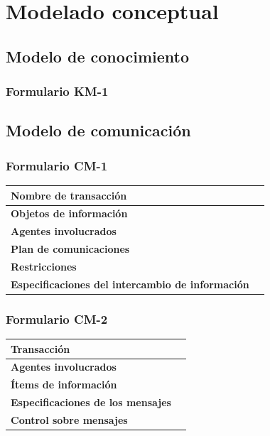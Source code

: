\documentclass[a4paper,11pt]{article}
\begin{document}
	\section{Modelado conceptual}
		\subsection{Modelo de conocimiento}
			\subsubsection{Formulario KM-1}
			
		\newpage
		\subsection{Modelo de comunicación}
			\subsubsection{Formulario CM-1}
			\begin{center}
				\begin{tabular}{| l | l |}
					\hline
					\textbf{Nombre de transacción} & \\
					\hline
					\textbf{Objetos de información} & \\
					\hline
					\textbf{Agentes involucrados} & \\
					\hline
					\textbf{Plan de comunicaciones} & \\
					\hline
					\textbf{Restricciones} & \\
					\hline
					\textbf{Especificaciones del intercambio de información} & \\
					\hline
				\end{tabular}
			\end{center}
			\subsubsection{Formulario CM-2}
			\begin{center}
				\begin{tabular}{| l | l |}
					\hline
					\textbf{Transacción} & \\
					\hline
					\textbf{Agentes involucrados} & \\
					\hline
					\textbf{Ítems de información} & \\
					\hline
					\textbf{Especificaciones de los mensajes} & \\
					\hline
					\textbf{Control sobre mensajes} & \\
					\hline
				\end{tabular}
			\end{center}
	\newpage
\end{document}
